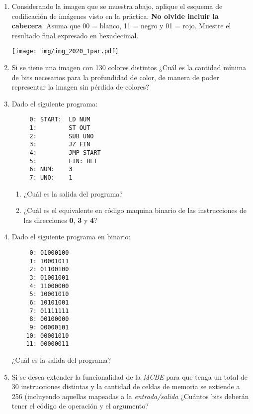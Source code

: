 \documentclass[12pt]{article}
\begin{document}
\begin{enumerate}
    \item Considerando la imagen que se muestra abajo, aplique el esquema de
    codificación de imágenes visto en la práctica. \textbf{No olvide incluir
    la cabecera}.  Asuma que 00 = blanco, 11 = negro y 01 = rojo. Muestre el
    resultado final expresado en hexadecimal.

    \texttt{[image: img/img\_2020\_1par.pdf]}

    \item Si se tiene una imagen con 130 colores distintos ¿Cuál es la
        cantidad mínima de bits necesarios para la profundidad de color, de
        manera de poder representar la imagen sin pérdida de colores?

    \item Dado el siguiente programa:

        \begin{verbatim}
     0: START:  LD NUM
     1:         ST OUT
     2:         SUB UNO
     3:         JZ FIN
     4:         JMP START
     5:         FIN: HLT
     6: NUM:    3
     7: UNO:    1
        \end{verbatim}

        \begin{enumerate}

            \item ¿Cuál es la salida del programa?

            \item ¿Cuál es el equivalente en código maquina binario de las
                instrucciones de las direcciones \textbf{0}, \textbf{3} y
                \textbf{4}?

        \end{enumerate}

    \item Dado el siguiente programa en binario:

        \begin{verbatim}
     0: 01000100
     1: 10001011
     2: 01100100
     3: 01001001
     4: 11000000
     5: 10001010
     6: 10101001
     7: 01111111
     8: 00100000
     9: 00000101
    10: 00001010
    11: 00000011
        \end{verbatim}

        ¿Cuál es la salida del programa?

    \item Si se desea extender la funcionalidad de la \emph{MCBE} para que
        tenga un total de 30 instrucciones distintas y la cantidad de celdas
        de memoria se extiende a 256 (incluyendo aquellas mapeadas a la
        \emph{entrada/salida} ¿Cuántos bits deberán tener el código de
        operación y el argumento?


\end{enumerate}
\end{document}
